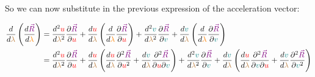 So we can now substitute in the previous expression of the acceleration vector:

\begin{align*}
    \frac{d}{d\begingroup\color{brown}\lambda\endgroup}\left(\frac{d\begingroup\color{violet}\vec{R}\endgroup}{d\begingroup\color{orange}\lambda\endgroup}\right) &= 
    \frac{d^2 \begingroup\color{red}u\endgroup}{d\begingroup\color{brown}\lambda\endgroup^2}\frac{\partial \begingroup\color{violet}\vec{R}\endgroup}{\partial \begingroup\color{red}u\endgroup} 
    + \frac{d \begingroup\color{red}u\endgroup}{d\begingroup\color{brown}\lambda\endgroup} \left(\frac{d}{d\begingroup\color{orange}\lambda\endgroup} \frac{\partial \begingroup\color{violet}\vec{R}\endgroup}{\partial \begingroup\color{red}u\endgroup}\right)
    + \frac{d^2 \begingroup\color{teal}v\endgroup}{d\begingroup\color{brown}\lambda\endgroup^2}\frac{\partial \begingroup\color{violet}\vec{R}\endgroup}{\partial \begingroup\color{teal}v\endgroup} 
    + \frac{d \begingroup\color{teal}v\endgroup}{d\begingroup\color{brown}\lambda\endgroup} \left(\frac{d}{d\begingroup\color{orange}\lambda\endgroup} \frac{\partial \begingroup\color{violet}\vec{R}\endgroup}{\partial \begingroup\color{teal}v\endgroup}\right)\\
    &= \frac{d^2 \begingroup\color{red}u\endgroup}{d\begingroup\color{brown}\lambda\endgroup^2}\frac{\partial \begingroup\color{violet}\vec{R}\endgroup}{\partial \begingroup\color{red}u\endgroup} 
    + \frac{d \begingroup\color{red}u\endgroup}{d\begingroup\color{brown}\lambda\endgroup} \left(\frac{d\begingroup\color{red}u\endgroup}{d\begingroup\color{brown}\lambda\endgroup} \frac{\partial^2 \begingroup\color{violet}\vec{R}\endgroup}{\partial \begingroup\color{red}u\endgroup^2}
    + \frac{d\begingroup\color{teal}v\endgroup}{d\begingroup\color{brown}\lambda\endgroup} \frac{\partial^2 \begingroup\color{violet}\vec{R}\endgroup}{\partial \begingroup\color{red}u\endgroup \partial\begingroup\color{teal}v\endgroup}\right)
    + \frac{d^2 \begingroup\color{teal}v\endgroup}{d\begingroup\color{brown}\lambda\endgroup^2}\frac{\partial \begingroup\color{violet}\vec{R}\endgroup}{\partial \begingroup\color{teal}v\endgroup} 
    + \frac{d \begingroup\color{teal}v\endgroup}{d\begingroup\color{brown}\lambda\endgroup} \left(\frac{d\begingroup\color{red}u\endgroup}{d\begingroup\color{brown}\lambda\endgroup} \frac{\partial^2 \begingroup\color{violet}\vec{R}\endgroup}{\partial \begingroup\color{teal}v\endgroup \partial\begingroup\color{red}u\endgroup}
    + \frac{d\begingroup\color{teal}v\endgroup}{d\begingroup\color{brown}\lambda\endgroup} \frac{\partial^2 \begingroup\color{violet}\vec{R}\endgroup}{\partial\begingroup\color{teal}v\endgroup^2}\right)\\

\end{align*}
